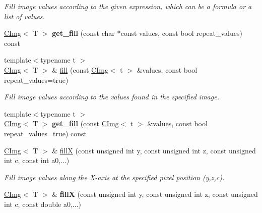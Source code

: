 \begin{DoxyCompactItemize}
\begin{DoxyCompactList}\small\item\em Fill image values according to the given expression, which can be a formula or a list of values. \item\end{DoxyCompactList}\item 
\hypertarget{structcimg__library_1_1CImg_aa38324724342138679aab7635e1b030e}{
\hyperlink{structcimg__library_1_1CImg}{CImg}$<$ T $>$ {\bfseries get\_\-fill} (const char $\ast$const values, const bool repeat\_\-values) const }
\label{structcimg__library_1_1CImg_aa38324724342138679aab7635e1b030e}

\item 
\hypertarget{structcimg__library_1_1CImg_a213bcaf42e377ddaf9ba1d6853d118c9}{
{\footnotesize template$<$typename t $>$ }\\\hyperlink{structcimg__library_1_1CImg}{CImg}$<$ T $>$ \& \hyperlink{structcimg__library_1_1CImg_a213bcaf42e377ddaf9ba1d6853d118c9}{fill} (const \hyperlink{structcimg__library_1_1CImg}{CImg}$<$ t $>$ \&values, const bool repeat\_\-values=true)}
\label{structcimg__library_1_1CImg_a213bcaf42e377ddaf9ba1d6853d118c9}

\begin{DoxyCompactList}\small\item\em Fill image values according to the values found in the specified image. \item\end{DoxyCompactList}\item 
\hypertarget{structcimg__library_1_1CImg_a02f4c95b1205c922a6401cfbe58fac98}{
{\footnotesize template$<$typename t $>$ }\\\hyperlink{structcimg__library_1_1CImg}{CImg}$<$ T $>$ {\bfseries get\_\-fill} (const \hyperlink{structcimg__library_1_1CImg}{CImg}$<$ t $>$ \&values, const bool repeat\_\-values=true) const }
\label{structcimg__library_1_1CImg_a02f4c95b1205c922a6401cfbe58fac98}

\item 
\hypertarget{structcimg__library_1_1CImg_a86c35f87fa09bd83ccb3b515811fa653}{
\hyperlink{structcimg__library_1_1CImg}{CImg}$<$ T $>$ \& \hyperlink{structcimg__library_1_1CImg_a86c35f87fa09bd83ccb3b515811fa653}{fillX} (const unsigned int y, const unsigned int z, const unsigned int c, const int a0,...)}
\label{structcimg__library_1_1CImg_a86c35f87fa09bd83ccb3b515811fa653}

\begin{DoxyCompactList}\small\item\em Fill image values along the X-\/axis at the specified pixel position (y,z,c). \item\end{DoxyCompactList}\item 
\hypertarget{structcimg__library_1_1CImg_aa8264b5adaeadba47cb08ed8828bf6e0}{
\hyperlink{structcimg__library_1_1CImg}{CImg}$<$ T $>$ \& {\bfseries fillX} (const unsigned int y, const unsigned int z, const unsigned int c, const double a0,...)}
\label{structcimg__library_1_1CImg_aa8264b5adaeadba47cb08ed8828bf6e0}


\end{DoxyCompactItemize}
